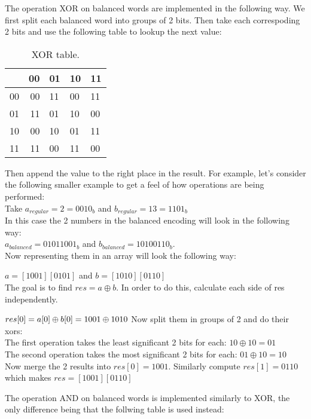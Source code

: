 \documentclass[conference]{IEEEtran}
\begin{document}
The operation XOR on balanced words are implemented in the following way. We first split each balanced word into groups of 2 bits. Then take each correspoding 2 bits and use the following table to lookup the next value:

\begin{table}[htbp]
  \renewcommand{\arraystretch}{1.3}
  \caption{XOR table.}
  \vspace{0.05 in}
  \label{tab:xor2}
  \centering
  \begin{tabular}{r|rllp{0.5in}}
    ~ & 00 & 01 & 10 & 11 \\ \hline
    00 & 00 & 11 & 00 & 11 \\
    01 & 11 & 01 & 10 & 00 \\
    10 & 00 & 10 & 01 & 11 \\
    11 & 11 & 00 & 11 & 00 \\
  \end{tabular}
\end{table}

Then append the value to the right place in the result. For example, let's consider the following smaller example to get a feel of how operations are being performed:\\
Take $a_{regular} = 2 = 0010_{b}$ and $b_{regular} = 13 = 1101_{b}$\\
In this case the 2 numbers in the balanced encoding will look in the following way:\\
$a_{balanced} = 01011001_{b}$ and $b_{balanced} = 10100110_{b}$. \\
Now representing them in an array will look the following way: 

$ a = [1001] [0101]$  and $ b = [1010][0110]$\\
The goal is to find $res = a \oplus b$. In order to do this, calculate each side of res independently.

$ res[0] = a[0] \oplus b[0] = 1001 \oplus 1010 \\$
Now split them in groups of 2 and do their xors: \\
The first operation takes the least significant 2 bits for each: $10 \oplus 10 = 01$\\
The second operation takes the most significant 2 bits for each: $01 \oplus 10 = 10$\\
Now merge the 2 results into $res[0] = 1001$. Similarly compute $res[1] = 0110$ which makes $res = [1001] [0110]$

The operation AND on balanced words is implemented similarly to XOR, the only difference being that the follwing table is used instead:
\end{document}
